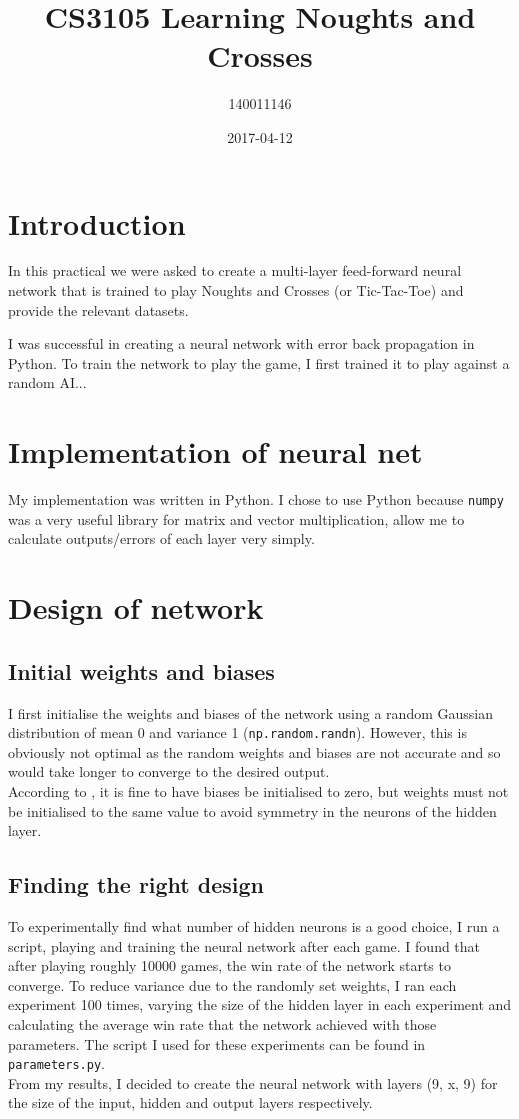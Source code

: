 \documentclass{article}
\title{CS3105 Learning Noughts and Crosses}
\date{2017-04-12}
\author{140011146}
\newcommand{\n}[0]{\\[\baselineskip]}
\begin{document}
\maketitle



\section{Introduction}
In this practical we were asked to create a multi-layer feed-forward neural network that is trained to play Noughts and Crosses (or Tic-Tac-Toe) and provide the relevant datasets.

I was successful in creating a neural network with error back propagation in Python. To train the network to play the game, I first trained it to play against a random AI...
\section{Implementation of neural net}
My implementation was written in Python. I chose to use Python because \texttt{numpy} was a very useful library for matrix and vector multiplication, allow me to calculate outputs/errors of each layer very simply. 


\section{Design of network}
\subsection{Initial weights and biases}
I first initialise the weights and biases of the network using a random Gaussian distribution of mean 0 and variance 1 (\texttt{np.random.randn}). However, this is obviously not optimal as the random weights and biases are not accurate and so would take longer to converge to the desired output. 
\n
According to \cite{DBLP}, it is fine to have biases be initialised to zero, but weights must not be initialised to the same value to avoid symmetry in the neurons of the hidden layer.

\subsection{Finding the right design}
To experimentally find what number of hidden neurons is a good choice, I run a script, playing and training the neural network after each game. I found that after playing roughly 10000 games, the win rate of the network starts to converge. To reduce variance due to the randomly set weights, I ran each experiment 100 times, varying the size of the hidden layer in each experiment and calculating the average win rate that the network achieved with those parameters. The script I used for these experiments can be found in \texttt{parameters.py}.
\n
From my results, I decided to create the neural network with layers (9, x, 9) for the size of the input, hidden and output layers respectively. 
\end{document}
